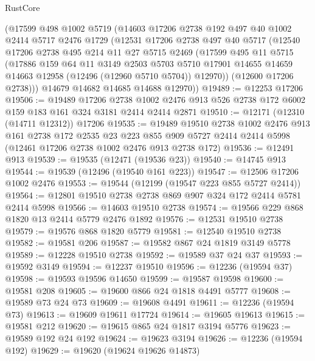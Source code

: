 \begin{lexlean}{RustCore}
\begin{coremodule}
    (@17599
      @498
      @1002
      @5719
      (@14603
        @17206
        @2738
        @192
        @497
        @40
        @1002
        @2414
        @5717
        @2476
        @1729
        (@12531
          @17206
          @2738
          @497
          @40
          @5717
          (@12540
            @17206
            @2738
            @495
            @214
            @11
            @27
            @5715
            @2469
            (@17599
              @495
              @11
              @5715
              (@17886
                @159
                @64
                @11
                @3149
                @2503
                @5703
                @5710
                @17901
                @14655
                @14659
                @14663
                @12958
                (@12496 (@12960 @5710 @5704))
                @12970))
            (@12600 @17206 @2738)))
        @14679
        @14682
        @14685
        @14688
        @12970))
@19489 := @12253 @17206
@19506 := @19489
    @17206
    @2738
    @1002
    @2476
    @913
    @526
    @2738
    @172
    @6002
    @159
    @183
    @161
    @324
    @3181
    @2414
    @2414
    @2871
@19510 := @12171 (@12310 (@14711 @12312)) @17206
@19535 := @19489
    @19510
    @2738
    @1002
    @2476
    @913
    @161
    @2738
    @172
    @2535
    @23
    @223
    @855
    @909
    @5727
    @2414
    @2414
    @5998
    (@12461 @17206 @2738 @1002 @2476 @913 @2738 @172)
@19536 := @12491 @913
@19539 := @19535 (@12471 (@19536 @23))
@19540 := @14745 @913
@19544 := @19539 (@12496 (@19540 @161 @223))
@19547 := @12506 @17206 @1002 @2476
@19553 := @19544 (@12199 (@19547 @223 @855 @5727 @2414))
@19564 := @12801 @19510 @2738 @2738 @869 @907 @324 @172 @2414 @5781 @2414 @5998
@19566 := @14603 @19510 @2738
@19574 := @19566 @229 @868 @1820 @13 @2414 @5779 @2476 @1892
@19576 := @12531 @19510 @2738
@19579 := @19576 @868 @1820 @5779
@19581 := @12540 @19510 @2738
@19582 := @19581 @206
@19587 := @19582 @867 @24 @1819 @3149 @5778
@19589 := @12228 @19510 @2738
@19592 := @19589 @37 @24 @37
@19593 := @19592 @3149
@19594 := @12237 @19510
@19596 := @12236 (@19594 @37)
@19598 := @19593 @19596 @14650
@19599 := @19587 @19598
@19600 := @19581 @208
@19605 := @19600 @866 @24 @1818 @4491 @5777
@19608 := @19589 @73 @24 @73
@19609 := @19608 @4491
@19611 := @12236 (@19594 @73)
@19613 := @19609 @19611 @17724
@19614 := @19605 @19613
@19615 := @19581 @212
@19620 := @19615 @865 @24 @1817 @3194 @5776
@19623 := @19589 @192 @24 @192
@19624 := @19623 @3194
@19626 := @12236 (@19594 @192)
@19629 := @19620 (@19624 @19626 @14873)

\end{coremodule}
\end{lexlean}
